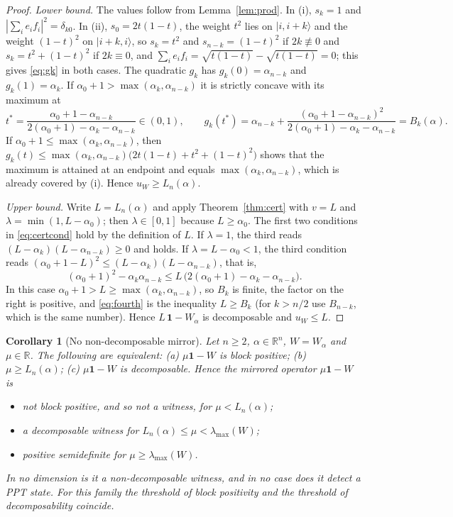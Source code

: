 \documentclass[11pt,a4paper]{article}
\newtheorem{corollary}[theorem]{Corollary}
\theoremstyle{remark}
\newcommand{\ket}[1]{\lvert #1\rangle}
\newcommand{\id}{\mathbf{1}}
\newcommand{\uW}{u_W}
\newcommand{\lmax}{\lambda_{\max}}
\begin{document}
\begin{proof}
\emph{Lower bound.} The values follow from Lemma~\ref{lem:prod}. In (i), $s_k=1$ and
$|\sum_ie_if_i|^2=\delta_{k0}$. In (ii), $s_0=2t(1-t)$, the weight $t^{2}$ lies on
$\ket{i,i+k}$ and the weight $(1-t)^{2}$ on $\ket{i+k,i}$, so $s_k=t^2$ and
$s_{n-k}=(1-t)^2$ if $2k\not\equiv0$ and $s_k=t^2+(1-t)^2$ if $2k\equiv0$, and
$\sum_ie_if_i=\sqrt{t(1-t)}-\sqrt{t(1-t)}=0$; this gives \eqref{eq:gk} in both cases. The
quadratic $g_k$ has $g_k(0)=\alpha_{n-k}$ and $g_k(1)=\alpha_k$. If
$\alpha_0+1>\max(\alpha_k,\alpha_{n-k})$ it is strictly concave with its maximum at
\begin{equation*}
t^{*}=\frac{\alpha_0+1-\alpha_{n-k}}{2(\alpha_0+1)-\alpha_k-\alpha_{n-k}}\in(0,1),
\qquad
g_k(t^{*})=\alpha_{n-k}+\frac{(\alpha_0+1-\alpha_{n-k})^{2}}{2(\alpha_0+1)-\alpha_k-\alpha_{n-k}}
=B_k(\alpha).
\end{equation*}
If $\alpha_0+1\le\max(\alpha_k,\alpha_{n-k})$, then
$g_k(t)\le\max(\alpha_k,\alpha_{n-k})\bigl(2t(1-t)+t^2+(1-t)^2\bigr)$ shows that the
maximum is attained at an endpoint and equals $\max(\alpha_k,\alpha_{n-k})$, which is
already covered by (i). Hence $\uW\ge L_n(\alpha)$.

\emph{Upper bound.} Write $L=L_n(\alpha)$ and apply Theorem~\ref{thm:cert} with $v=L$ and
$\lambda=\min(1,L-\alpha_0)$; then $\lambda\in[0,1]$ because $L\ge\alpha_0$. The first two
conditions in \eqref{eq:certcond} hold by the definition of $L$. If $\lambda=1$, the
third reads $(L-\alpha_k)(L-\alpha_{n-k})\ge0$ and holds. If $\lambda=L-\alpha_0<1$, the
third condition reads $(\alpha_0+1-L)^{2}\le(L-\alpha_k)(L-\alpha_{n-k})$, that is,
\begin{equation}\label{eq:fourth}
(\alpha_0+1)^{2}-\alpha_k\alpha_{n-k}\le L\,\bigl(2(\alpha_0+1)-\alpha_k-\alpha_{n-k}\bigr).
\end{equation}
In this case $\alpha_0+1>L\ge\max(\alpha_k,\alpha_{n-k})$, so $B_k$ is finite, the
factor on the right is positive, and \eqref{eq:fourth} is the inequality $L\ge B_k$ (for
$k>n/2$ use $B_{n-k}$, which is the same number). Hence $L\,\id-W_\alpha$ is decomposable
and $\uW\le L$.
\end{proof}

\begin{corollary}[No non-decomposable mirror]\label{cor:nogo}
Let $n\ge2$, $\alpha\in\mathbb{R}^n$, $W=W_\alpha$ and $\mu\in\mathbb{R}$. The following
are equivalent: (a) $\mu\id-W$ is block positive; (b) $\mu\ge L_n(\alpha)$; (c)
$\mu\id-W$ is decomposable. Hence the mirrored operator $\mu\id-W$ is
\begin{itemize}
\item not block positive, and so not a witness, for $\mu<L_n(\alpha)$;
\item a decomposable witness for $L_n(\alpha)\le\mu<\lmax(W)$;
\item positive semidefinite for $\mu\ge\lmax(W)$.
\end{itemize}
In no dimension is it a non-decomposable witness, and in no case does it detect a PPT
state. For this family the threshold of block positivity and the threshold of
decomposability coincide.
\end{corollary}
\end{document}
